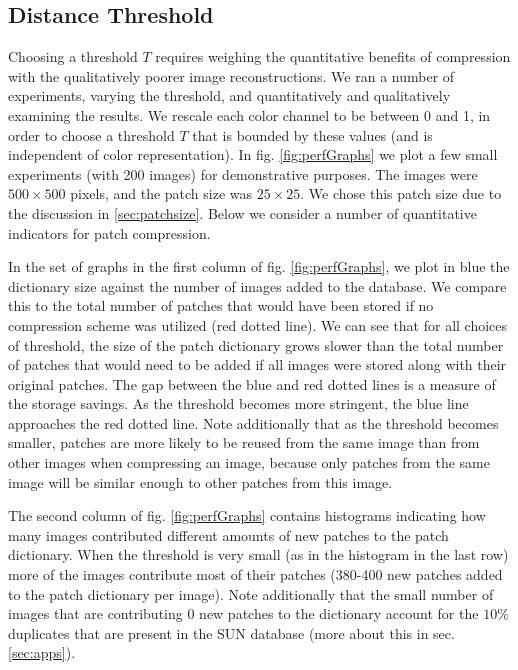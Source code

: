 \subsection{Distance Threshold}

Choosing a threshold $T$ requires weighing the quantitative benefits of compression with the qualitatively poorer image reconstructions. We ran a number of experiments, varying the threshold, and quantitatively and qualitatively examining the results. We rescale each color channel to be between 0 and 1, in order to choose a threshold $T$ that is bounded by these values (and is independent of color representation). In fig. \ref{fig:perfGraphs} we plot a few small experiments (with 200 images) for demonstrative purposes. The images were $500\times 500$ pixels, and the patch size was $25\times 25$. We chose this patch size due to the discussion in \ref{sec:patchsize}. Below we consider a number of quantitative indicators for patch compression. 

In the set of graphs in the first column of fig. \ref{fig:perfGraphs}, we plot in blue the dictionary size against the number of images added to the database. We compare this to the total number of patches that would have been stored if no compression scheme was utilized (red dotted line). We can see that for all choices of threshold, the size of the patch dictionary grows slower than the total number of patches that would need to be added if all images were stored along with their original patches. The gap between the blue and red dotted lines is a measure of the storage savings. As the threshold becomes more stringent, the blue line approaches the red dotted line. Note additionally that as the threshold becomes smaller, patches are more likely to be reused from the same image than from other images when compressing an image, because only patches from the same image will be similar enough to other patches from this image.

The second column of fig. \ref{fig:perfGraphs} contains histograms indicating how many images contributed different amounts of new patches to the patch dictionary. When the threshold is very small (as in the histogram in the last row) more of the images contribute most of their patches (380-400 new patches added to the patch dictionary per image). Note additionally that the small number of images that are contributing 0 new patches to the dictionary account for the $10\%$ duplicates that are present in the SUN database (more about this in sec. \ref{sec:apps}).

